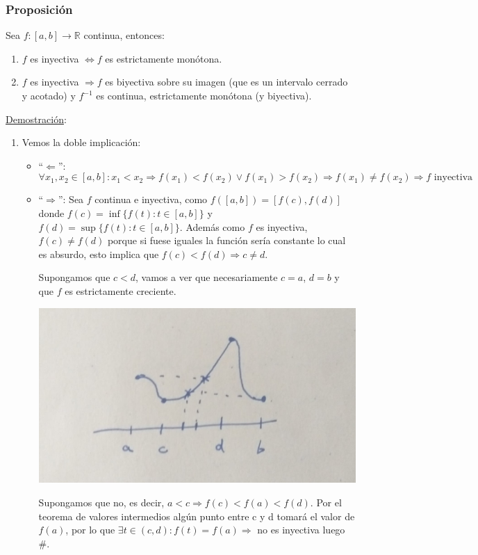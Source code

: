 \documentclass[10pt,a4paper,openright]{book}
\begin{document}
\subsubsection*{Proposición}
Sea $f:[a,b]\rightarrow \mathbb R$ continua, entonces:
\begin{enumerate}
\item $f$ es inyectiva $\Leftrightarrow f$ es estrictamente monótona.

\item $f$ es inyectiva $\Rightarrow f$ es biyectiva sobre su imagen (que es un intervalo cerrado y acotado) y $f^{-1}$ es continua, estrictamente monótona (y biyectiva).
\end{enumerate}

\underline{Demostración}:
\begin{enumerate}
\item Vemos la doble implicación:
	\begin{itemize}
	\item ``$\Leftarrow$'':
	$$\forall x_1, x_2\in [a,b]: x_1<x_2\Rightarrow f(x_1)<f(x_2) \vee f(x_1)>f(x_2)\Rightarrow f(x_1)\neq f(x_2) \Rightarrow f\mbox{ inyectiva}$$
	
	\item ``$\Rightarrow$'':
	Sea $f$ continua e inyectiva, como $f([a,b])=[f(c), f(d)]$ donde $f(c)=\inf\{f(t): t\in [a,b]\}$ y $f(d)=\sup\{f(t): t\in [a,b]\}$. Además como $f$ es inyectiva, $f(c)\neq f(d)$ porque si fuese iguales la función sería constante lo cual es absurdo, esto implica que $f(c)<f(d)\Rightarrow c\neq d$.
	
	Supongamos que $c<d$, vamos a ver que necesariamente $c=a$, $d=b$ y que $f$ es estrictamente creciente.
	\begin{center}
	\includegraphics[scale=0.20]{inyectivas continuas son monotonas}
	\end{center}
	Supongamos que no, es decir, $a<c\Rightarrow f(c)< f(a)< f(d)$. Por el teorema de valores intermedios algún punto entre c y d tomará el valor de $f(a)$, por lo que $\exists t\in (c,d): f(t)=f(a)\Rightarrow $ no es inyectiva luego \#.
	

\end{itemize}
\end{enumerate}
\end{document}
